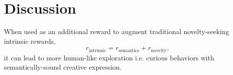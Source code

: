 \chapter{Discussion}
\label{sec:discussion}








When used as an additional reward to augment traditional novelty-seeking intrinsic rewards, 
\begin{equation}
    \label{eq:intrinsic-reward}
    r_{\text{intrinsic}} = r_{\text{semantics}} + r_{\text{novelty}},
\end{equation}
it can lead to more human-like exploration i.e. curious behaviors with semantically-sound creative expression.
